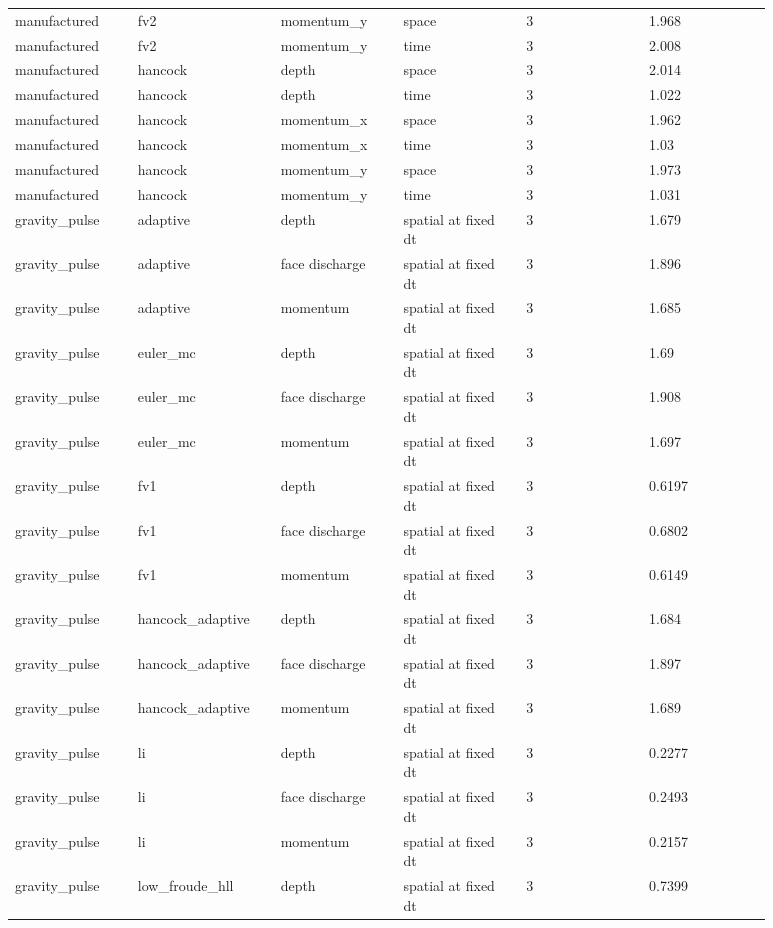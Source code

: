 \begin{longtable}{p{0.1467\linewidth}p{0.1467\linewidth}p{0.1467\linewidth}p{0.1467\linewidth}p{0.1467\linewidth}p{0.1467\linewidth}}
manufactured & fv2 & momentum\_y & space & 3 & 1.968 \\
manufactured & fv2 & momentum\_y & time & 3 & 2.008 \\
manufactured & hancock & depth & space & 3 & 2.014 \\
manufactured & hancock & depth & time & 3 & 1.022 \\
manufactured & hancock & momentum\_x & space & 3 & 1.962 \\
manufactured & hancock & momentum\_x & time & 3 & 1.03 \\
manufactured & hancock & momentum\_y & space & 3 & 1.973 \\
manufactured & hancock & momentum\_y & time & 3 & 1.031 \\
gravity\_pulse & adaptive & depth & spatial at fixed dt & 3 & 1.679 \\
gravity\_pulse & adaptive & face discharge & spatial at fixed dt & 3 & 1.896 \\
gravity\_pulse & adaptive & momentum & spatial at fixed dt & 3 & 1.685 \\
gravity\_pulse & euler\_mc & depth & spatial at fixed dt & 3 & 1.69 \\
gravity\_pulse & euler\_mc & face discharge & spatial at fixed dt & 3 & 1.908 \\
gravity\_pulse & euler\_mc & momentum & spatial at fixed dt & 3 & 1.697 \\
gravity\_pulse & fv1 & depth & spatial at fixed dt & 3 & 0.6197 \\
gravity\_pulse & fv1 & face discharge & spatial at fixed dt & 3 & 0.6802 \\
gravity\_pulse & fv1 & momentum & spatial at fixed dt & 3 & 0.6149 \\
gravity\_pulse & hancock\_adaptive & depth & spatial at fixed dt & 3 & 1.684 \\
gravity\_pulse & hancock\_adaptive & face discharge & spatial at fixed dt & 3 & 1.897 \\
gravity\_pulse & hancock\_adaptive & momentum & spatial at fixed dt & 3 & 1.689 \\
gravity\_pulse & li & depth & spatial at fixed dt & 3 & 0.2277 \\
gravity\_pulse & li & face discharge & spatial at fixed dt & 3 & 0.2493 \\
gravity\_pulse & li & momentum & spatial at fixed dt & 3 & 0.2157 \\
gravity\_pulse & low\_froude\_hll & depth & spatial at fixed dt & 3 & 0.7399 \\

\end{longtable}
